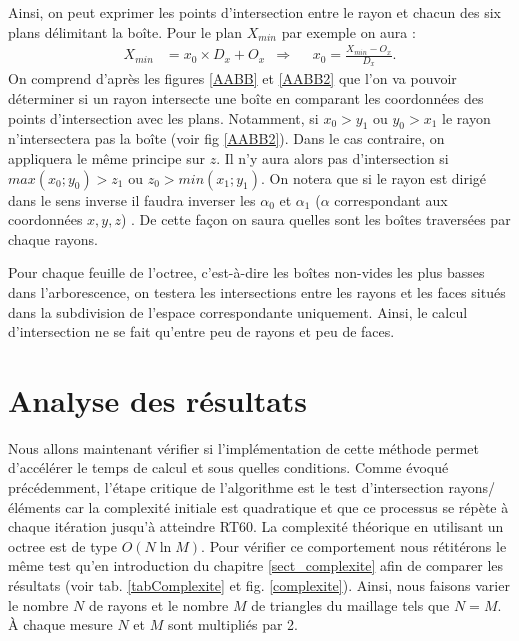 %
Ainsi, on peut exprimer les points d'intersection entre le rayon et chacun des six plans délimitant la boîte. Pour le plan $X_{min}$ par exemple on aura :
%
\begin{align*}
X_{min} &= x_0 \times D_x + O_x 	& \Rightarrow 	& &	 x_0 = \frac{X_{min} - O_x}{D_x}.
\end{align*}
%
On comprend d'après les figures \ref{AABB} et \ref{AABB2} que l'on va pouvoir déterminer si un rayon intersecte une boîte en comparant les coordonnées des points d'intersection avec les plans. Notamment, si $x_0 > y_1$ ou $y_0 > x_1$ le rayon n'intersectera pas la boîte (voir fig \ref{AABB2}). Dans le cas contraire, on appliquera le même principe sur $z$. Il n'y aura alors pas d'intersection si $max(x_0 ; y_0) > z_1$ ou $ z_0 > min(x_1 ; y_1)$. On notera que si le rayon est dirigé dans le sens inverse il faudra inverser les $\alpha_0$ et $\alpha_1$ ($\alpha$ correspondant aux coordonnées $x,y,z$) . De cette façon on saura quelles sont les boîtes traversées par chaque rayons. 

Pour chaque feuille de l'\gls{octree}, c'est-à-dire les boîtes non-vides les plus basses dans l'arborescence, on testera les intersections entre les rayons et les faces situés dans la subdivision de l'espace correspondante uniquement. Ainsi, le calcul d'intersection ne se fait qu'entre peu de rayons et peu de faces.



\section{Analyse des résultats} \label{sect_resultatOctree}

Nous allons maintenant vérifier si l'implémentation de cette méthode permet d'accélérer le temps de calcul et sous quelles conditions. Comme évoqué précédemment, l'étape critique de l'algorithme est le test d'intersection rayons/éléments car la complexité initiale est quadratique et que ce processus se répète à chaque itération jusqu'à atteindre \gls{RT60}. La complexité théorique en utilisant un \gls{octree} est de type $O(N\ln{M})$. 
Pour vérifier ce comportement nous rétitérons le même test qu'en introduction du chapitre \ref{sect_complexite} afin de comparer les résultats (voir tab. \ref{tabComplexite} et fig. \ref{complexite}). Ainsi, nous faisons varier le nombre $N$ de rayons et le nombre $M$ de triangles du maillage tels que $N = M$. À chaque mesure $N$ et $M$ sont multipliés par 2.

